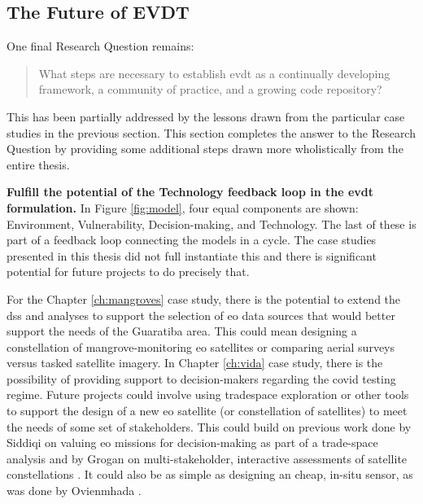 \subsection{The Future of EVDT} \label{sec:future}

One final Research Question remains:

\blockquote{What steps are necessary to establish \ac{evdt} as a continually developing framework, a community of practice, and a growing code repository?}

This has been partially addressed by the lessons drawn from the particular case studies in the previous section. This section completes the answer to the Research Question by providing some additional steps drawn more wholistically from the entire thesis.

\textbf{Fulfill the potential of the Technology feedback loop in the \ac{evdt} formulation.} In Figure \ref{fig:model}, four equal components are shown: Environment, Vulnerability, Decision-making, and Technology. The last of these is part of a feedback loop connecting the models in a cycle. The case studies presented in this thesis did not full instantiate this and there is significant potential for future projects to do precisely that. 

For the Chapter \ref{ch:mangroves} case study, there is the potential to extend the \ac{dss} and analyses to support the selection of \ac{eo} data sources that would better support the needs of the Guaratiba area. This could mean designing a constellation of mangrove-monitoring \ac{eo} satellites or comparing aerial surveys versus tasked satellite imagery. In Chapter \ref{ch:vida} case study, there is the possibility of providing support to decision-makers regarding the \ac{covid} testing regime. Future projects could involve using tradespace exploration or other tools to support the design of a new \ac{eo} satellite (or constellation of satellites) to meet the needs of some set of stakeholders. This could build on previous work done by Siddiqi on valuing \ac{eo} missions for decision-making as part of a trade-space analysis \cite{siddiqiValuingNewEarth2019, siddiqiValuingRadiometricQuality2021} and by Grogan on multi-stakeholder, interactive assessments of satellite constellations \cite{groganMultistakeholderInteractiveSimulation2014, groganInteractiveSimulationGames2015}. It could also be as simple as designing an cheap, in-situ sensor, as was done by Ovienmhada \cite{ovienmhadaEarthObservationTechnology2020}.


